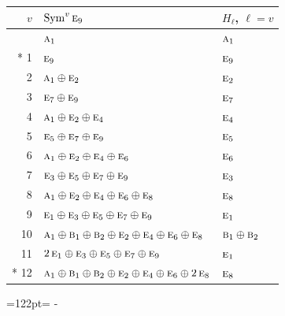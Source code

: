 \documentclass[10pt,a4paper]{article}
\newcommand{\needspace}[1]{\par\penalty-100\begingroup\dimen0=#1\relax\dimen2=\pagegoal
  \advance\dimen2-\pagetotal\ifdim\dimen0>\dimen2\relax\ifdim\dimen2>0pt\vfil\break\fi\fi
  \endgroup}
\numberwithin{equation}{section}
\newcommand{\irr}[1]{\text{\normalfont\scshape #1}}
\begin{document}
{\small\begin{longtable}{@{}rll@{}}\toprule
$v$ & $\operatorname{Sym}^{v}\irr{e}_{9}$ & $H_\ell$, $\ell = v$\\\midrule\endhead
\bottomrule\endfoot\endlastfoot
0 & $\irr{a}_{1}$ & $\irr{a}_{1}$\\*
1 & $\irr{e}_{9}$ & $\irr{e}_{9}$\\
2 & $\irr{a}_{1} \oplus \irr{e}_{2}$ & $\irr{e}_{2}$\\
3 & $\irr{e}_{7} \oplus \irr{e}_{9}$ & $\irr{e}_{7}$\\
4 & $\irr{a}_{1} \oplus \irr{e}_{2} \oplus \irr{e}_{4}$ & $\irr{e}_{4}$\\
5 & $\irr{e}_{5} \oplus \irr{e}_{7} \oplus \irr{e}_{9}$ & $\irr{e}_{5}$\\
6 & $\irr{a}_{1} \oplus \irr{e}_{2} \oplus \irr{e}_{4} \oplus \irr{e}_{6}$ & $\irr{e}_{6}$\\
7 & $\irr{e}_{3} \oplus \irr{e}_{5} \oplus \irr{e}_{7} \oplus \irr{e}_{9}$ & $\irr{e}_{3}$\\
8 & $\irr{a}_{1} \oplus \irr{e}_{2} \oplus \irr{e}_{4} \oplus \irr{e}_{6} \oplus \irr{e}_{8}$ & $\irr{e}_{8}$\\
9 & $\irr{e}_{1} \oplus \irr{e}_{3} \oplus \irr{e}_{5} \oplus \irr{e}_{7} \oplus \irr{e}_{9}$ & $\irr{e}_{1}$\\
10 & $\irr{a}_{1} \oplus \irr{b}_{1} \oplus \irr{b}_{2} \oplus \irr{e}_{2} \oplus \irr{e}_{4} \oplus \irr{e}_{6} \oplus \irr{e}_{8}$ & $\irr{b}_{1} \oplus \irr{b}_{2}$\\
11 & $2\,\irr{e}_{1} \oplus \irr{e}_{3} \oplus \irr{e}_{5} \oplus \irr{e}_{7} \oplus \irr{e}_{9}$ & $\irr{e}_{1}$\\*
12 & $\irr{a}_{1} \oplus \irr{b}_{1} \oplus \irr{b}_{2} \oplus \irr{e}_{2} \oplus \irr{e}_{4} \oplus \irr{e}_{6} \oplus 2\,\irr{e}_{8}$ & $\irr{e}_{8}$\\
\bottomrule\end{longtable}}
\needspace{122pt}
\end{document}
